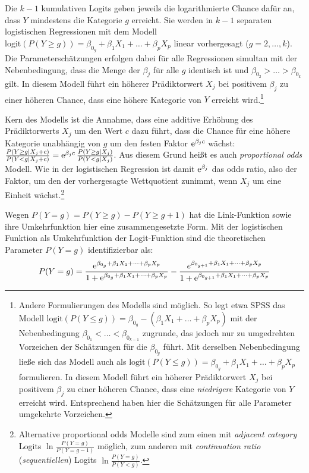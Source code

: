 Die $k-1$ kumulativen Logits geben jeweils die logarithmierte Chance dafür an, dass $Y$ mindestens die Kategorie $g$ erreicht. Sie werden in $k-1$ separaten logistischen Regressionen mit dem Modell $\text{logit}(P(Y \geq g)) = \beta_{0_{g}} + \beta_{1} X_{1} + \dots + \beta_{p} X_{p}$ linear vorhergesagt ($g = 2, \ldots, k$). Die Parameterschätzungen erfolgen dabei für alle Regressionen simultan mit der Nebenbedingung, dass die Menge der $\beta_{j}$ für alle $g$ identisch ist und $\beta_{0_{2}} > \dots > \beta_{0_{k}}$ gilt. In diesem Modell führt ein höherer Prädiktorwert $X_{j}$ bei positivem $\beta_{j}$ zu einer höheren Chance, dass eine höhere Kategorie von $Y$ erreicht wird.\footnote{Andere Formulierungen des Modells sind möglich. So legt etwa  SPSS das Modell $\text{logit}(P(Y \leq g)) = \beta_{0_{g}} - (\beta_{1} X_{1} + \dots + \beta_{p} X_{p})$  mit der Nebenbedingung $\beta_{0_{1}} < \dots < \beta_{0_{k-1}}$ zugrunde, das jedoch nur zu umgedrehten Vorzeichen der Schätzungen für die $\beta_{0_{g}}$ führt. Mit derselben Nebenbedingung ließe sich das Modell auch als $\text{logit}(P(Y \leq g)) = \beta_{0_{g}} + \beta_{1} X_{1} + \dots + \beta_{p} X_{p}$ formulieren. In diesem Modell führt ein höherer Prädiktorwert $X_{j}$ bei positivem $\beta_{j}$ zu einer höheren Chance, dass eine \emph{niedrigere} Kategorie von $Y$ erreicht wird. Entsprechend haben hier die Schätzungen für alle Parameter umgekehrte Vorzeichen.}

Kern des Modells ist die Annahme, dass eine additive Erhöhung des Prädiktorwerts $X_{j}$ um den Wert $c$ dazu führt, dass die Chance für eine höhere Kategorie unabhängig von $g$ um den festen Faktor ${\mathrm{e}}^{\beta_{j} c}$ wächst: $\frac{P(Y \geq g | X_{j}+c)}{P(Y < g | X_{j}+c)} = {\mathrm{e}}^{\beta_{j} c} \, \frac{P(Y \geq g | X_{j})}{P(Y < g | X_{j})}$. Aus diesem Grund heißt es auch \emph{proportional odds} Modell. Wie in der logistischen Regression ist damit ${\mathrm{e}}^{\beta_{j}}$ das odds ratio, also der Faktor, um den der vorhergesagte Wettquotient zunimmt, wenn $X_{j}$ um eine Einheit wächst.\footnote{\label{ftn:ordLogits}Alternative proportional odds Modelle sind zum einen mit \emph{adjacent category} Logits $\ln \frac{P(Y=g)}{P(Y=g-1)}$ möglich, zum anderen mit \emph{continuation ratio} (\emph{sequentiellen}) Logits $\ln \frac{P(Y=g)}{P(Y<g)}$.}

Wegen $P(Y=g) = P(Y \geq g) - P(Y \geq g+1)$ hat die Link-Funktion sowie ihre Umkehrfunktion hier eine zusammengesetzte Form. Mit der logistischen Funktion als Umkehrfunktion der Logit-Funktion sind die theoretischen Parameter $P(Y=g)$ identifizierbar als:
\begin{equation*}
P(Y=g) = \frac{{\mathrm{e}}^{\beta_{0_{g}} + \beta_{1} X_{1} + \dots + \beta_{p} X_{p}}}{1 + {\mathrm{e}}^{\beta_{0_{g}} + \beta_{1} X_{1} + \dots + \beta_{p} X_{p}}} - \frac{e^{\beta_{0_{g+1}} + \beta_{1} X_{1} + \dots + \beta_{p} X_{p}}}{1 + {\mathrm{e}}^{\beta_{0_{g+1}} + \beta_{1} X_{1} + \dots + \beta_{p} X_{p}}}
\end{equation*}


